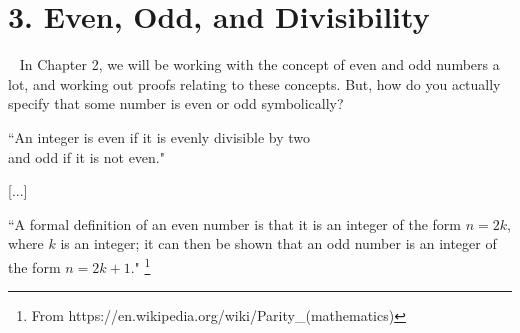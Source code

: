 \documentclass[a4paper,12pt]{book}
\begin{document}
    \newpage

    \section*{3. Even, Odd, and Divisibility}

        \begin{intro}{\ }
            In Chapter 2, we will be working with the concept of even and
            odd numbers a lot, and working out proofs relating to these concepts.
            But, how do you actually specify that some number is even or odd symbolically?

            \begin{center}
                ``An integer is even if it is evenly divisible by two\\ and odd if it is not even."

                [...]

                ``A formal definition of an even number is that it is an integer of the form $n = 2k$,
                where $k$ is an integer;
                it can then be shown that an odd number is an integer of the form $n = 2k + 1$."
                \footnote{From https://en.wikipedia.org/wiki/Parity\_(mathematics)}
            \end{center}

        \end{intro}
\end{document}
